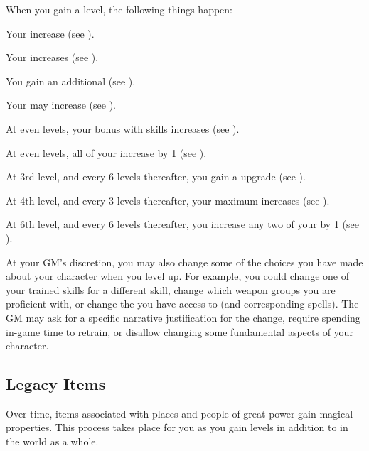     When you gain a level, the following things happen:
    \begin{raggeditemize}
        \item Your  increase (see ).
        \item Your  increases (see ).
        \item You gain an additional  (see ).
        \item Your  may increase (see ).
        \item At even levels, your bonus with  skills increases (see ).
        \item At even levels, all of your  increase by 1 (see ).
        \item At 3rd level, and every 6 levels thereafter, you gain a  upgrade (see ).
        \item At 4th level, and every 3 levels thereafter, your maximum  increases (see ).
        \item At 6th level, and every 6 levels thereafter, you increase any two of your  by 1 (see ).
    \end{raggeditemize}

    At your GM's discretion, you may also change some of the choices you have made about your character when you level up.
    For example, you could change one of your trained skills for a different skill, change which weapon groups you are proficient with, or change the  you have access to (and corresponding spells).
    The GM may ask for a specific narrative justification for the change, require spending in-game time to retrain, or disallow changing some fundamental aspects of your character.

    \subsection{Legacy Items}\label{Legacy Items}

        Over time, items associated with places and people of great power gain magical properties.
        This process takes place for you as you gain levels in addition to in the world as a whole.

